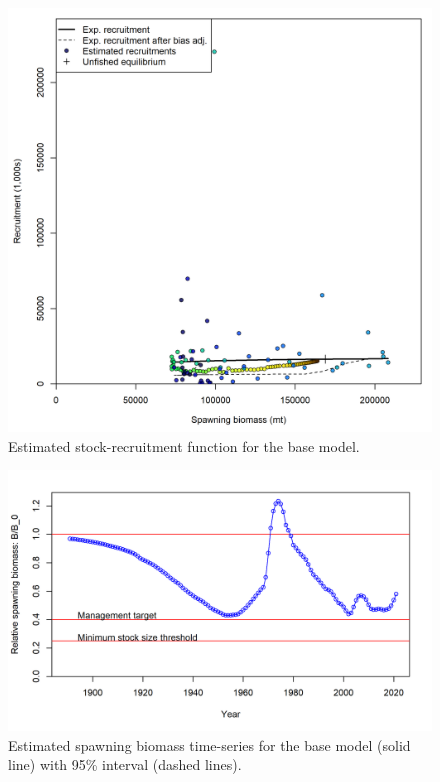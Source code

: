\documentclass[11pt,
  english,
  a4paper,
]{article}
\begin{document}
\tagmcend\tagstructend


\begin{figure}
\centering
\includegraphics[width=1\textwidth,height=1\textheight]{figs/SR_curve.png}
\caption{Estimated stock-recruitment function for the base model. \label{fig:SR_curve}}
\end{figure}

\tagmcend\tagstructend


\begin{figure}
\centering
\includegraphics[width=1\textwidth,height=1\textheight]{figs/ts9_Relative_spawning_biomass.png}
\caption{Estimated spawning biomass time-series for the base model (solid line) with 95\% interval (dashed lines).\label{ts9}}
\end{figure}
\end{document}
